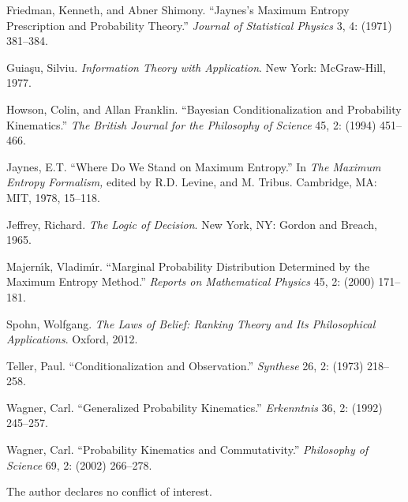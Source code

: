 \documentclass[entropy,article,submit,oneauthor,pdftex,12pt,a4paper]{mdpi}
\begin{document}
Friedman, Kenneth, and Abner Shimony. ``Jaynes's Maximum Entropy Prescription and Probability Theory.'' \emph{Journal of Statistical Physics} 3, 4: (1971) 381--384.

Guia{\c{s}}u, Silviu. \emph{Information Theory with Application}. New York: McGraw-Hill, 1977.

Howson, Colin, and Allan Franklin. ``Bayesian Conditionalization and Probability Kinematics.'' \emph{The British Journal for the Philosophy of Science} 45, 2: (1994) 451--466.

Jaynes, E.T. ``Where Do We Stand on Maximum Entropy.'' In \emph{The Maximum Entropy Formalism,} edited by R.D. Levine, and M. Tribus. Cambridge, MA: MIT, 1978, 15--118.

Jeffrey, Richard. \emph{The Logic of Decision}. New York, NY: Gordon and Breach, 1965.

Majern{\'\i}k, Vladim{\'\i}r. ``Marginal Probability Distribution Determined by the Maximum Entropy Method.'' \emph{Reports on Mathematical Physics} 45, 2: (2000) 171--181.

Spohn, Wolfgang. \emph{The Laws of Belief: Ranking Theory and Its Philosophical Applications}. Oxford, 2012.

Teller, Paul. ``Conditionalization and Observation.'' \emph{Synthese} 26, 2: (1973) 218--258.

Wagner, Carl. ``Generalized Probability Kinematics.'' \emph{Erkenntnis} 36, 2: (1992) 245--257.

Wagner, Carl. ``Probability Kinematics and Commutativity.'' \emph{Philosophy of Science} 69, 2: (2002) 266--278.









The author declares no conflict of interest. 

% 
\end{document}
